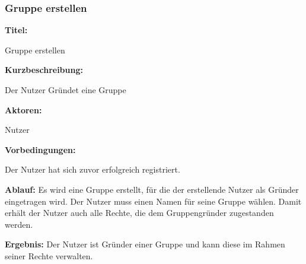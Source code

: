 \documentclass{scrartcl}
\begin{document}
	\subsubsection{Gruppe erstellen}
	\begin{description}
		\item \textbf{Titel:}
		\begin{description}
			\item Gruppe erstellen
		\end{description}
		\item \textbf{Kurzbeschreibung:}
		\begin{description}
			\item Der Nutzer Gründet eine Gruppe
		\end{description}
		\item \textbf{Aktoren:}
		\begin{description}
			\item Nutzer 
		\end{description}
		\item \textbf{Vorbedingungen:}
		\begin{description}
			\item Der Nutzer hat sich zuvor erfolgreich registriert.
		\end{description}
		\item \textbf{Ablauf:} \newline Es wird eine Gruppe erstellt, für die der erstellende Nutzer als Gründer eingetragen wird. Der Nutzer muss einen Namen für seine Gruppe wählen. Damit erhält der Nutzer auch alle Rechte, die dem Gruppengründer zugestanden werden.
		\item \textbf{Ergebnis:} \newline Der Nutzer ist Gründer einer Gruppe und kann diese im Rahmen seiner Rechte verwalten.
	\end{description}
	
	\newpage
	
\end{document}
